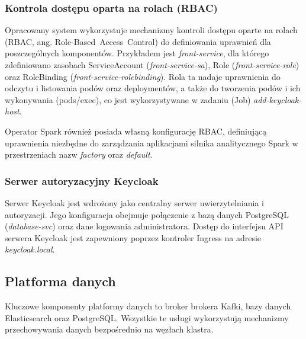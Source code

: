 \subsubsection{Kontrola dostępu oparta na rolach (RBAC)}
\label{subsubsec:RBAC}
Opracowany system wykorzystuje mechanizmy kontroli dostępu oparte na rolach (RBAC, ang. \mbox{Role-Based Access Control}) do definiowania uprawnień dla poszczególnych komponentów. Przykładem jest \textit{front-service}, dla którego zdefiniowano zasobach ServiceAccount (\textit{front-service-sa}), Role (\textit{front-service-role}) oraz RoleBinding (\textit{front-service-rolebinding}). Rola ta nadaje uprawnienia do odczytu i listowania podów oraz deploymentów, a także do tworzenia podów i ich wykonywania (pods/exec), co jest wykorzystywane w zadaniu (Job) \textit{add-keycloak-host}.

Operator Spark również posiada własną konfigurację RBAC, definiującą uprawnienia niezbędne do zarządzania aplikacjami silnika analitycznego Spark w przestrzeniach nazw \textit{factory} oraz \textit{default}.

\subsubsection{Serwer autoryzacyjny Keycloak}
Serwer Keycloak jest wdrożony jako centralny serwer uwierzytelniania i autoryzacji. Jego konfiguracja obejmuje połączenie z bazą danych PostgreSQL (\textit{database-svc}) oraz dane logowania administratora. Dostęp do interfejsu API serwera Keycloak jest zapewniony poprzez kontroler Ingress na adresie \textit{keycloak.local}.

\subsection{Platforma danych}

Kluczowe komponenty platformy danych to broker brokera Kafki, bazy danych Elasticsearch oraz PostgreSQL. Wszystkie te usługi wykorzystują mechanizmy przechowywania danych bezpośrednio na węzłach klastra.

